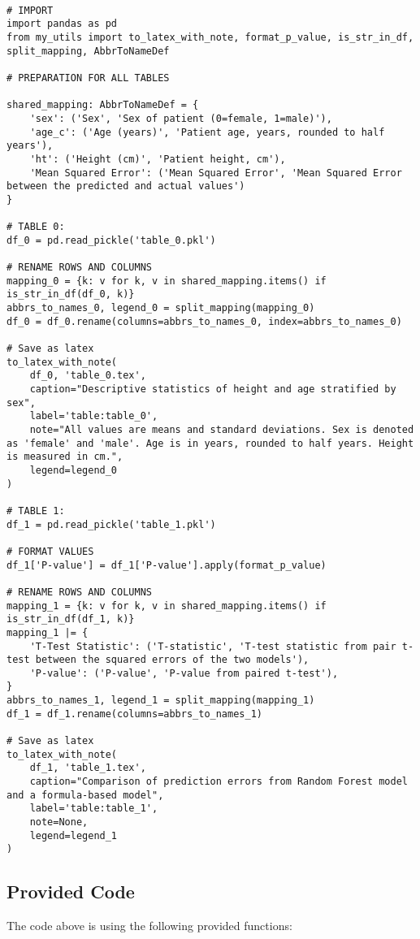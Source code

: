 \documentclass[11pt]{article}
\begin{document}
\begin{verbatim}

# IMPORT
import pandas as pd
from my_utils import to_latex_with_note, format_p_value, is_str_in_df, split_mapping, AbbrToNameDef

# PREPARATION FOR ALL TABLES

shared_mapping: AbbrToNameDef = {
    'sex': ('Sex', 'Sex of patient (0=female, 1=male)'),
    'age_c': ('Age (years)', 'Patient age, years, rounded to half years'),
    'ht': ('Height (cm)', 'Patient height, cm'),
    'Mean Squared Error': ('Mean Squared Error', 'Mean Squared Error between the predicted and actual values')
}

# TABLE 0:
df_0 = pd.read_pickle('table_0.pkl')

# RENAME ROWS AND COLUMNS
mapping_0 = {k: v for k, v in shared_mapping.items() if is_str_in_df(df_0, k)}
abbrs_to_names_0, legend_0 = split_mapping(mapping_0)
df_0 = df_0.rename(columns=abbrs_to_names_0, index=abbrs_to_names_0)

# Save as latex
to_latex_with_note(
    df_0, 'table_0.tex',
    caption="Descriptive statistics of height and age stratified by sex",
    label='table:table_0',
    note="All values are means and standard deviations. Sex is denoted as 'female' and 'male'. Age is in years, rounded to half years. Height is measured in cm.",
    legend=legend_0
)

# TABLE 1:
df_1 = pd.read_pickle('table_1.pkl')

# FORMAT VALUES
df_1['P-value'] = df_1['P-value'].apply(format_p_value)

# RENAME ROWS AND COLUMNS
mapping_1 = {k: v for k, v in shared_mapping.items() if is_str_in_df(df_1, k)}
mapping_1 |= {
    'T-Test Statistic': ('T-statistic', 'T-test statistic from pair t-test between the squared errors of the two models'),
    'P-value': ('P-value', 'P-value from paired t-test'),
}
abbrs_to_names_1, legend_1 = split_mapping(mapping_1)
df_1 = df_1.rename(columns=abbrs_to_names_1)

# Save as latex
to_latex_with_note(
    df_1, 'table_1.tex',
    caption="Comparison of prediction errors from Random Forest model and a formula-based model",
    label='table:table_1',
    note=None,
    legend=legend_1
)

\end{verbatim}

\subsection{Provided Code}
The code above is using the following provided functions:
\end{document}
